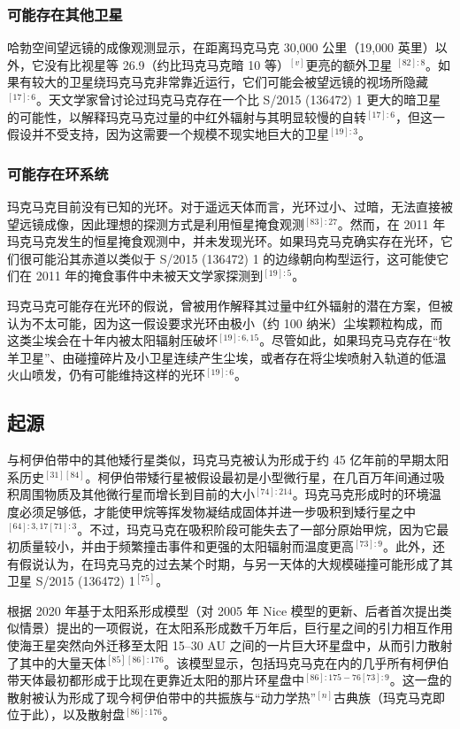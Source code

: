 \subsubsection{可能存在其他卫星}
哈勃空间望远镜的成像观测显示，在距离玛克马克 30,000 公里（19,000 英里）以外，它没有比视星等 26.9（约比玛克马克暗 10 等）$^{[v]}$更亮的额外卫星 $^{[82]:8}$。如果有较大的卫星绕玛克马克非常靠近运行，它们可能会被望远镜的视场所隐藏$^{[17]:6}$。天文学家曾讨论过玛克马克存在一个比 S/2015 (136472) 1 更大的暗卫星的可能性，以解释玛克马克过量的中红外辐射与其明显较慢的自转$^{[17]:6}$，但这一假设并不受支持，因为这需要一个规模不现实地巨大的卫星$^{[19]:3}$。
\subsubsection{可能存在环系统}
玛克马克目前没有已知的光环。对于遥远天体而言，光环过小、过暗，无法直接被望远镜成像，因此理想的探测方式是利用恒星掩食观测$^{[83]:27}$。然而，在 2011 年玛克马克发生的恒星掩食观测中，并未发现光环。如果玛克马克确实存在光环，它们很可能沿其赤道以类似于 S/2015 (136472) 1 的边缘朝向构型运行，这可能使它们在 2011 年的掩食事件中未被天文学家探测到$^{[19]:5}$。

玛克马克可能存在光环的假说，曾被用作解释其过量中红外辐射的潜在方案，但被认为不太可能，因为这一假设要求光环由极小（约 100 纳米）尘埃颗粒构成，而这类尘埃会在十年内被太阳辐射压破坏$^{[19]:6,15}$。尽管如此，如果玛克马克存在“牧羊卫星”、由碰撞碎片及小卫星连续产生尘埃，或者存在将尘埃喷射入轨道的低温火山喷发，仍有可能维持这样的光环$^{[19]:6}$。
\subsection{起源}
与柯伊伯带中的其他矮行星类似，玛克马克被认为形成于约 45 亿年前的早期太阳系历史$^{[31][84]}$。柯伊伯带矮行星被假设最初是小型微行星，在几百万年间通过吸积周围物质及其他微行星而增长到目前的大小$^{[74]:214}$。玛克马克形成时的环境温度必须足够低，才能使甲烷等挥发物凝结成固体并进一步吸积到矮行星之中$^{[64]:3,17[71]:3}$。不过，玛克马克在吸积阶段可能失去了一部分原始甲烷，因为它最初质量较小，并由于频繁撞击事件和更强的太阳辐射而温度更高$^{[73]:9}$。此外，还有假说认为，在玛克马克的过去某个时期，与另一天体的大规模碰撞可能形成了其卫星 S/2015 (136472) 1$^{[75]}$。

根据 2020 年基于太阳系形成模型（对 2005 年 Nice 模型的更新、后者首次提出类似情景）提出的一项假说，在太阳系形成数千万年后，巨行星之间的引力相互作用使海王星突然向外迁移至太阳 15–30 AU 之间的一片巨大环星盘中，从而引力散射了其中的大量天体$^{[85][86]:176}$。该模型显示，包括玛克马克在内的几乎所有柯伊伯带天体最初都形成于比现在更靠近太阳的那片环星盘中$^{[86]:175-76[73]:9}$。这一盘的散射被认为形成了现今柯伊伯带中的共振族与“动力学热”$^{[n]}$古典族（玛克马克即位于此），以及散射盘$^{[86]:176}$。
